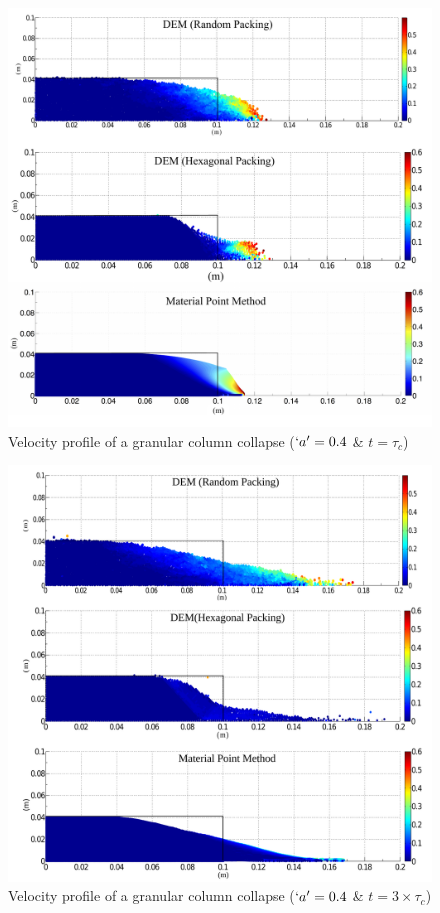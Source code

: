 \begin{figure}[tbhp]
\centering
\includegraphics[width=\textwidth]{a04tc}
\caption{Velocity profile of a granular column collapse ($`a' = 0.4$ \& 
$t=\tau_c$)}
\label{fig:a04tc}
\end{figure}

\begin{figure}[tbhp]
\centering
\includegraphics[width=\textwidth]{a04f}
\caption{Velocity profile of a granular column collapse ($`a' = 0.4$ \& 
$t=3\times\tau_c$)}
\label{fig:a04f}
\end{figure}


